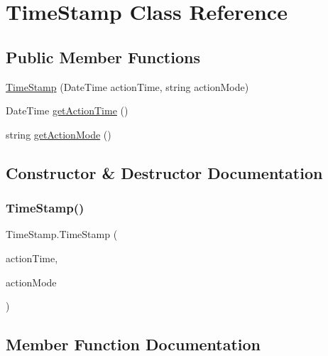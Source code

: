 \hypertarget{classTimeStamp}{}\section{Time\+Stamp Class Reference}
\label{classTimeStamp}
\subsection*{Public Member Functions}
\begin{DoxyCompactItemize}
\item 
\hyperlink{classTimeStamp_ae9ffa3706d19523c5fe43e23fe436f8d}{Time\+Stamp} (Date\+Time action\+Time, string action\+Mode)
\item 
Date\+Time \hyperlink{classTimeStamp_a10a14e554b1fa549ac6b19edbdd3179c}{get\+Action\+Time} ()
\item 
string \hyperlink{classTimeStamp_ad30b4576e73772cd5ad15ff6174d5c99}{get\+Action\+Mode} ()
\end{DoxyCompactItemize}


\subsection{Constructor \& Destructor Documentation}
\mbox{\label{classTimeStamp_ae9ffa3706d19523c5fe43e23fe436f8d}} 
\subsubsection{\texorpdfstring{Time\+Stamp()}{TimeStamp()}}
{\footnotesize\ttfamily Time\+Stamp.\+Time\+Stamp (\begin{DoxyParamCaption}\item[{Date\+Time}]{action\+Time,  }\item[{string}]{action\+Mode }\end{DoxyParamCaption})\hspace{0.3cm}{\ttfamily [inline]}}



\subsection{Member Function Documentation}
\mbox{\label{classTimeStamp_ad30b4576e73772cd5ad15ff6174d5c99}} 
